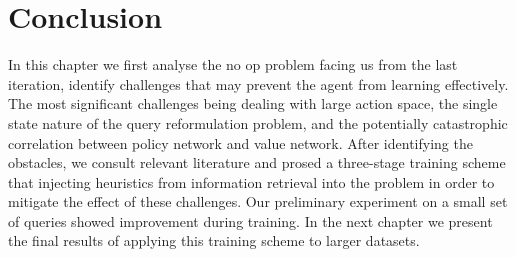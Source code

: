 \section{Conclusion}

In this chapter we first analyse the no op problem facing us from the last iteration, identify challenges that may prevent the agent from learning effectively. The most significant challenges being dealing with large action space, the single state nature of the query reformulation problem, and the potentially catastrophic correlation between policy network and value network. After identifying the obstacles, we consult relevant literature and prosed a three-stage training scheme that injecting heuristics from information retrieval into the problem in order to mitigate the effect of these challenges. Our preliminary experiment on a small set of queries showed improvement during training.  In the next chapter we present the final results of applying this training scheme to larger datasets.

